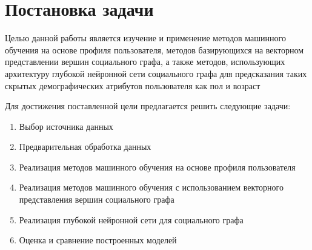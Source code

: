 \section{Постановка задачи}

Целью данной работы является изучение и применение методов машинного обучения на основе профиля пользователя, методов базирующихся на векторном представлении вершин социального графа, а также методов, использующих архитектуру глубокой нейронной сети социального графа для предсказания таких скрытых демографических атрибутов пользователя как пол и возраст 

Для достижения поставленной цели предлагается решить следующие задачи:

\begin{enumerate}
\item Выбор источника данных
\item Предварительная обработка данных
\item Реализация методов машинного обучения на основе профиля пользователя
\item Реализация методов машинного обучения с использованием векторного представления вершин социального графа
\item Реализация глубокой нейронной сети для социального графа
\item Оценка и сравнение построенных моделей
\end{enumerate}

\clearpage